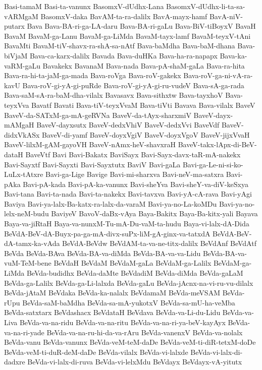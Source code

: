 {Basi-tamaM
Basi-ta-vanunx
BasomxV-dUdhx-Lana
BasomxV-dUdhx-li-ta-sa-vARMgaM
BasomxV-daka
BavAM-ta-ra-dalilx
BavA-mayx-hamf
BavA-niV-putarx
Bava
Bava-BA-ri-ga-LA-daru
Bava-BA-ri-gaLu
Bava-BiV-tiBoyxV
BavaH
BavaM
BavaM-ga-Lanu
BavaM-ga-LiMda
BavaM-tayx-lamf
BavaM-teyxV-tAni
BavaMti
BavaM-tiV-shavx-ra-shA-sa-nAtf
Bava-baMdha
Bava-baM-dhana
Bava-biVjaM
Bava-ca-karx-dalilx
Bavada
Bava-duHKa
Bava-ha-ra-napapx
Bava-ka-vaRM-gaLu
Bavakekx
BavanaM
Bava-nada
Bava-pA-shaM-gaLa
Bava-ra-hita
Bava-ra-hi-ta-jaM-ga-mada
Bava-roVga
Bava-roV-gakekx
Bava-roV-ga-ni-vA-ra-kavU
Bava-roV-gi-yA-gi-puRde
Bava-roV-gi-yA-gi-ru-vudeV
Bava-sA-ga-rada
Bava-saM-sA-ra-baM-dha-vilalx
Bavasavx
Bava-sithxtw
Bava-tayxhoV
Bava-teyxVva
Bavatf
Bavati
Bava-tiV-teyxVvaM
Bava-tiVti
Bavava
Bava-vilalx
BaveV
BaveV-da-SATxM-ga-mA-geRVNa
BaveV-da-tAyx-sharxmiV
BaveV-dayx-mAMgaH
BaveV-dayxsutx
BaveV-dedxVhiV
BaveV-dedxVvi
BaveVdf
BaveV-didxVkASx
BaveV-di-yamf
BaveV-doyxVgiV
BaveV-doyxVgoV
BaveV-jijxVvaH
BaveV-lilxM-gAM-gayoVH
BaveV-nAmx-heV-shavxraH
BaveV-takx-lApx-di-BeV-dataH
BaveVtf
Bavi
Bavi-Bakatx
BaviSayx
Bavi-Sayx-davx-taR-mA-nakekx
Bavi-Sayxtf
Bavi-Sayxti
Bavi-Sayxtutx
BaviV
Bavi-gaLa
Bavi-ga-Le-ni-si-ko-LuLx-tAtxre
Bavi-ga-Lige
Bavige
Bavi-mi-sharxva
Bavi-neV-ma-satxra
Bavi-pAka
Bavi-pA-kada
Bavi-pA-ka-vanunx
Bavi-sheYva
Bavi-sheY-va-diV-keSxya
Bavi-tana
Bavi-ta-nada
Bavi-ta-nakekx
Bavi-tavxva
Bavi-yA-cA-rava
Bavi-yAgi
Baviya
Bavi-ya-lalx-Ba-katx-ra-lalx-da-varaM
Bavi-ya-no-La-koMDu
Bavi-ya-no-lelx-neM-budu
BaviyeV
BavoV-daBx-vAya
Baya-Bakitx
Baya-Ba-kitx-yali
Bayava
Baya-va-jiRtaH
Baya-va-nunxM-Tu-mA-Du-vaM-ta-hudu
Baya-vi-lalx-dA-Dida
BeVdA-BeV-dA-Buyx-pa-ga-mA-divx-suPx-liM-gA-ginx-va-tatxdA
BeVdA-BeV-dA-tamx-ka-vAda
BeVdA-BeVdw
BeVdAM-ta-va-ne-titx-dalilx
BeVdAnf
BeVdAtf
BeVda
BeVda-BAva
BeVda-BA-va-diMda
BeVda-BA-va-va-Lidu
BeVda-BA-va-vuM-TeM-bene
BeVdaH
BeVdaM
BeVdaM-gaLa
BeVdaM-ga-Lalilx
BeVdaM-ga-LiMda
BeVda-budidhx
BeVda-daMte
BeVdadiM
BeVda-diMda
BeVda-gaLaM
BeVda-ga-Lalilx
BeVda-ga-Li-lalxda
BeVda-gaLu
BeVda-jAcnx-na-vi-ru-vu-dilalx
BeVda-jAtaM
BeVdaka
BeVda-ka-nalalx
BeVdamaM
BeVda-meVSAM
BeVda-rUpu
BeVda-saM-baMdha
BeVda-sa-mA-yukotxV
BeVda-sa-mU-ha-veMba
BeVda-satxtarx
BeVdashacx
BeVdataH
BeVdava
BeVda-va-Li-du-Lidu
BeVda-va-Liva
BeVda-va-na-ridu
BeVda-va-na-ritu
BeVda-va-na-ri-ya-beV-kayAyx
BeVda-va-na-ri-yade
BeVda-va-na-ru-hi-da-va-rAru
BeVda-vanenxV
BeVda-va-nolalx
BeVda-vanu
BeVda-vanunx
BeVda-veM-teM-daDe
BeVda-veM-ti-diR-tetxM-doDe
BeVda-veM-ti-duR-deM-daDe
BeVda-vilalx
BeVda-vi-lalxde
BeVda-vi-lalx-di-dadxre
BeVda-vi-lalx-di-ruva
BeVda-vi-lelxMdu
BeVdayx
BeVdayx-vA-yitutx
}
